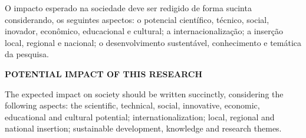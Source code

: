 \documentclass[
  12pt,		%
  a4paper,	%
  openright,  %
  oneside,	%
  chapter=TITLE,		%
  section=TITLE,		%
  english,	%
  french,	    %
  spanish,	%
  brazil	    %
]{abntex2}
\begin{document}
    
    \imprimircapa
    \imprimirfolhaderosto
    
    
     \begin{resumo}
O impacto esperado na sociedade deve ser redigido de forma sucinta considerando, os seguintes aspectos: o potencial científico, técnico, social, inovador, econômico, educacional e cultural; a internacionalização; a inserção local, regional e nacional;  o desenvolvimento sustentável, conhecimento e temática da pesquisa. 

\vspace*{0.5cm}
        
        \begin{center}
            \noindent\textbf{\MakeUppercase{POTENTIAL IMPACT OF THIS RESEARCH }}
        \end{center}
        

\vspace*{0.5cm}

The expected impact on society should be written succinctly, considering the following aspects: the scientific, technical, social, innovative, economic, educational and cultural potential; internationalization; local, regional and national insertion; sustainable development, knowledge and research themes.

      \end{resumo}
      
\end{document}
